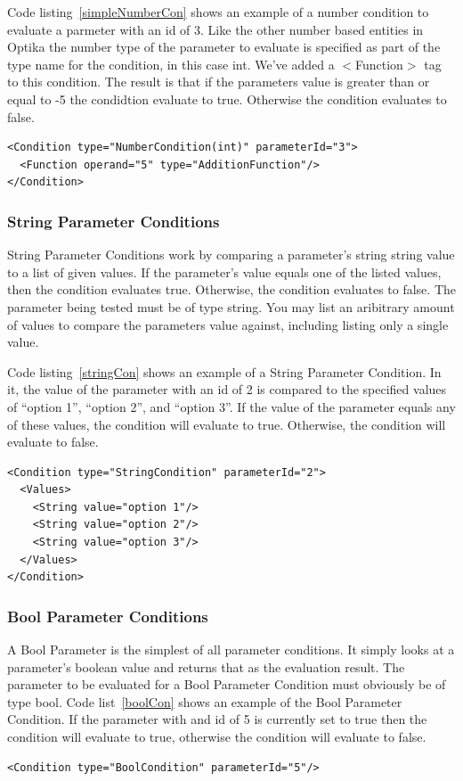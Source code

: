 Code listing~\ref{simpleNumberCon} shows an example of a number condition to evaluate a parmeter with an id of 3. Like the other number based entities in Optika the number 
type of the parameter to evaluate is specified as part of the type name for the condition, in this case int. We've added a $<$Function$>$ tag to this condition. The result is 
that if the parameters value is greater than or equal to -5 the condidtion evaluate to true. Otherwise the condition evaluates to false.
\begin{lstlisting}[caption={Example of a Number Parameter Condition}, label=simpleNumberCon]
<Condition type="NumberCondition(int)" parameterId="3">
  <Function operand="5" type="AdditionFunction"/>
</Condition>
\end{lstlisting}

\subsubsection{String Parameter Conditions}
String Parameter Conditions work by comparing a parameter's string string value to a list of given values. If the parameter's value equals one of the listed values, then the
condition evaluates true. Otherwise, the condition evaluates to false. The parameter being tested must be of type string. You may list an aribitrary amount of values to 
compare the parameters value against, including listing only a single value.

Code listing~\ref{stringCon} shows an example of a String Parameter Condition. In it, the value of the parameter with an id of 2 is compared to the specified values of
``option 1'', ``option 2'', and ``option 3''. If the value of the parameter equals any of these values, the condition will evaluate to true. Otherwise, the condition will
evaluate to false.
\begin{lstlisting}[caption={Example of a String Parameter Condition}, label=stringCon]
<Condition type="StringCondition" parameterId="2">
  <Values>
    <String value="option 1"/> 
    <String value="option 2"/> 
    <String value="option 3"/> 
  </Values>
</Condition>
\end{lstlisting}

\subsubsection{Bool Parameter Conditions}
A Bool Parameter is the simplest of all parameter conditions. It simply looks at a parameter's boolean value and returns that as the evaluation result. The parameter to be
evaluated for a Bool Parameter Condition must obviously be of type bool. Code list~\ref{boolCon} shows an example of the Bool Parameter Condition. If the parameter with and id
of 5 is currently set to true then the condition will evaluate to true, otherwise the condition will evaluate to false.
\begin{lstlisting}[caption={Example of a Bool Parameter Condition}, label=boolCon]
<Condition type="BoolCondition" parameterId="5"/>
\end{lstlisting}

